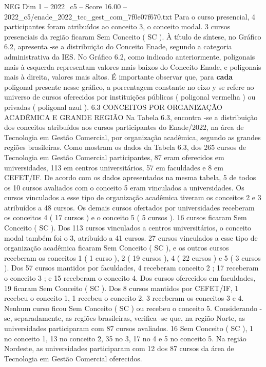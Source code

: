 \begin{textsample}{NEG Dim 1 – 2022\_c5 – Score 16.00 – 2022\_c5/enade\_2022\_tec\_gest\_com\_7f0e07f670.txt}
Para o curso presencial, 4 participantes foram atribuídos ao conceito 3, o conceito modal. 3 cursos presenciais da região ficaram Sem Conceito ( SC ).
À título de síntese, no Gráfico 6.2, apresenta -se a distribuição do Conceito Enade, segundo a categoria administrativa da IES.
No Gráfico 6.2, como indicado anteriormente, poligonais mais à esquerda representam valores mais baixos do Conceito Enade, e poligonais mais à direita, valores mais altos.
É importante observar que, para \textbf{cada} poligonal presente nesse gráfico, a porcentagem constante no eixo y se refere ao universo de cursos oferecidos por instituições públicas ( poligonal vermelha ) ou privadas ( poligonal azul ). 6.3 CONCEITOS POR ORGANIZAÇÃO ACADÊMICA E GRANDE REGIÃO Na Tabela 6.3, encontra -se a distribuição dos conceitos atribuídos aos cursos participantes do Enade/2022, na área de Tecnologia em Gestão Comercial, por organização acadêmica, segundo as grandes regiões brasileiras.
Como mostram os dados da Tabela 6.3, dos 265 cursos de Tecnologia em Gestão Comercial participantes, 87 eram oferecidos em universidades, 113 em centros universitários, 57 em faculdades e 8 em CEFET/IF.
De acordo com os dados apresentados na mesma tabela, 5 de todos os 10 cursos avaliados com o conceito 5 eram vinculados a universidades.
Os cursos vinculados a esse tipo de organização acadêmica tiveram os conceitos 2 e 3 atribuídos a 48 cursos.
Os demais cursos ofertados por universidades receberam os conceitos 4 ( 17 cursos ) e o conceito 5 ( 5 cursos ). 16 cursos ficaram Sem Conceito ( SC ).
Dos 113 cursos vinculados a centros universitários, o conceito modal também foi o 3, atribuído a 41 cursos. 27 cursos vinculados a esse tipo de organização acadêmica ficaram Sem Conceito ( SC ), e os outros cursos receberam os conceitos 1 ( 1 curso ), 2 ( 19 cursos ), 4 ( 22 cursos ) e 5 ( 3 cursos ).
Dos 57 cursos mantidos por faculdades, 4 receberam conceito 2 ; 17 receberam o conceito 3 ; e 15 receberam o conceito 4.
Dos cursos oferecidos em faculdades, 19 ficaram Sem Conceito ( SC ).
Dos 8 cursos mantidos por CEFET/IF, 1 recebeu o conceito 1, 1 recebeu o conceito 2, 3 receberam os conceitos 3 e 4.
Nenhum curso ficou Sem Conceito ( SC ) ou recebeu o conceito 5.
Considerando -se, separadamente, as regiões brasileiras, verifica -se que, na região Norte, as universidades participaram com 87 cursos avaliados. 16 Sem Conceito ( SC ), 1 no conceito 1, 13 no conceito 2, 35 no 3, 17 no 4 e 5 no conceito 5.
Na região Nordeste, as universidades participaram com 12 dos 87 cursos da área de Tecnologia em Gestão Comercial oferecidos.

\end{textsample}
